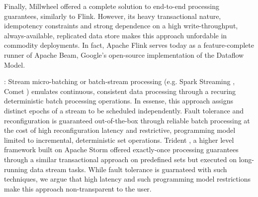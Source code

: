 Finally, Millwheel \cite{millwheel} offered a complete solution to end-to-end processing guarantees, similarly to Flink. However, its heavy transactional nature, idempotency constraints and strong dependence on a high write-throughput, always-available, replicated data store \cite{chang2008bigtable,corbett2013spanner} makes this approach unfordable in commodity deployments. In fact, Apache Flink serves today as a feature-complete runner of Apache Beam, Google's open-source implementation of the Dataflow Model\cite{CUSTOM:web/Dataflow}.

: Stream micro-batching or batch-stream processing (e.g. Spark Streaming \cite{zaharia2012discretized}, Comet \cite{he2010comet}) emulates continuous, consistent data processing through a recuring deterministic batch processing operations. In essense, this approach assigns distinct epochs of a stream to be scheduled independently. Fault tolerance and reconfiguration is guaranteed out-of-the-box through reliable batch processing at the cost of high reconfiguration latency and restrictive, programming model limited to incremental, deterministic set operations. Trident \cite{CUSTOM:web/trident}, a higher level framework built on Apache Storm offered exactly-once processing guarantees through a similar transactional approach on predefined sets but executed on long-running data stream tasks. While fault tolerance is guarnateed with such techniques, we argue that high latency and such programming model restrictions make this approach non-transparent to the user. 
